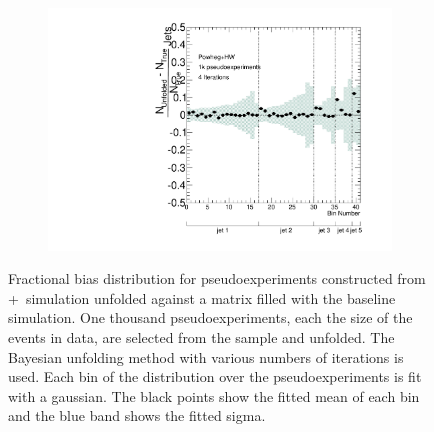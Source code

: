 \begin{figure}
\begin{subfigure}[]{0.5\textwidth}
\end{subfigure}
~
\begin{subfigure}[]{0.5\textwidth}
\includegraphics[width=\textwidth]{fig/Stress/105860atlfast/FracBias4Iterations.pdf}
\end{subfigure}
\caption{Fractional bias distribution for pseudoexperiments constructed from \newline \pow+\hw\ simulation unfolded against a matrix filled with the baseline simulation. One thousand pseudoexperiments, each the size of the events in data, are selected from the sample and unfolded. The Bayesian unfolding method with various numbers of iterations is used. Each bin of the distribution over the pseudoexperiments is fit with a gaussian. The black points show the fitted mean of each bin and the blue band shows the fitted sigma. }
\label{fig:powhwfrbias}
\end{figure}
\clearpage


